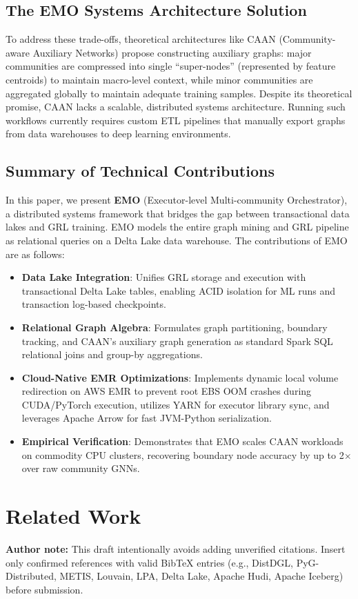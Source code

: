 \documentclass[conference,compsoc]{IEEEtran}
\begin{document}
\subsection{The EMO Systems Architecture Solution}
To address these trade-offs, theoretical architectures like CAAN (Community-aware Auxiliary Networks) propose constructing auxiliary graphs: major communities are compressed into single ``super-nodes'' (represented by feature centroids) to maintain macro-level context, while minor communities are aggregated globally to maintain adequate training samples. Despite its theoretical promise, CAAN lacks a scalable, distributed systems architecture. Running such workflows currently requires custom ETL pipelines that manually export graphs from data warehouses to deep learning environments.

\subsection{Summary of Technical Contributions}
In this paper, we present \textbf{EMO} (Executor-level Multi-community Orchestrator), a distributed systems framework that bridges the gap between transactional data lakes and GRL training. EMO models the entire graph mining and GRL pipeline as relational queries on a Delta Lake data warehouse. The contributions of EMO are as follows:
\begin{itemize}
    \item \textbf{Data Lake Integration}: Unifies GRL storage and execution with transactional Delta Lake tables, enabling ACID isolation for ML runs and transaction log-based checkpoints.
    \item \textbf{Relational Graph Algebra}: Formulates graph partitioning, boundary tracking, and CAAN's auxiliary graph generation as standard Spark SQL relational joins and group-by aggregations.
    \item \textbf{Cloud-Native EMR Optimizations}: Implements dynamic local volume redirection on AWS EMR to prevent root EBS OOM crashes during CUDA/PyTorch execution, utilizes YARN for executor library sync, and leverages Apache Arrow for fast JVM-Python serialization.
    \item \textbf{Empirical Verification}: Demonstrates that EMO scales CAAN workloads on commodity CPU clusters, recovering boundary node accuracy by up to 2$\times$ over raw community GNNs.
\end{itemize}

\section{Related Work}
\noindent\textbf{Author note:} This draft intentionally avoids adding unverified citations. Insert only confirmed references with valid BibTeX entries (e.g., DistDGL, PyG-Distributed, METIS, Louvain, LPA, Delta Lake, Apache Hudi, Apache Iceberg) before submission.
\end{document}

